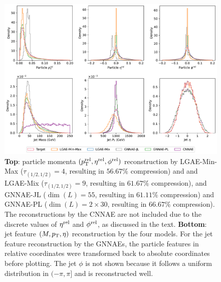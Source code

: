 \begin{figure}[ht!]
    \centering
    \includegraphics[width=\linewidth]{figures/06-ML4Jets/lgae/reconstructions/hist-cnnae.pdf}
    \caption[Particle and jet feature reconstruction by the LGAE, GNNAE, and CNNAE models.]{
        \textbf{Top}:
        particle momenta $(p_\mathrm{T}^\mathrm{rel}, \eta^\mathrm{rel}, \phi^\mathrm{rel})$ reconstruction by
        LGAE-Min-Max ($\tau_{(1/2, 1/2)}=4$, resulting in $56.67\%$ compression) and
        and LGAE-Mix ($\tau_{(1/2, 1/2)}=9$, resulting in $61.67\%$ compression),
        and GNNAE-JL ($\dim(L) = 55$, resulting in $61.11\%$ compression) and
        GNNAE-PL ($\dim(L) = 2\times 30$, resulting in $66.67\%$ compression). The reconstructions by the CNNAE are not included due to the discrete values of $\eta^\mathrm{rel}$ and $\phi^\mathrm{rel}$, as discussed in the text. 
        \textbf{Bottom}:
        jet feature $(M, p_\mathrm{T}, \eta)$ reconstruction by the four models.
        For the jet feature reconstruction by the GNNAEs, the particle features in relative coordinates were transformed back to absolute coordinates before plotting.
        The jet $\phi$ is not shown because it follows a uniform distribution in $(-\pi, \pi]$ and is reconstructed well.
    }
    \label{fig:06_lgae_recons-hist}
\end{figure}


